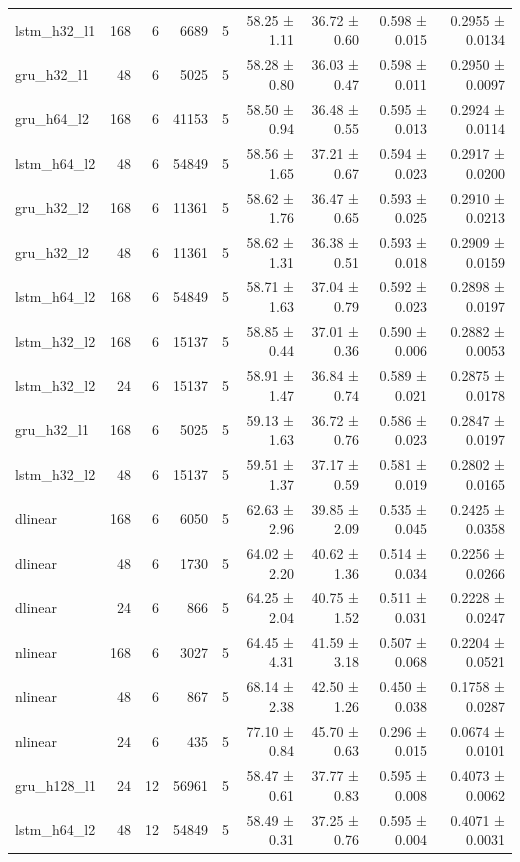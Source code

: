 \begin{table}[htbp]
\begin{tabular}{lrrrrrrrr}
lstm\_h32\_l1 & 168 & 6 & 6689 & 5 & 58.25 ± 1.11 & 36.72 ± 0.60 & 0.598 ± 0.015 & 0.2955 ± 0.0134 \\
gru\_h32\_l1 & 48 & 6 & 5025 & 5 & 58.28 ± 0.80 & 36.03 ± 0.47 & 0.598 ± 0.011 & 0.2950 ± 0.0097 \\
gru\_h64\_l2 & 168 & 6 & 41153 & 5 & 58.50 ± 0.94 & 36.48 ± 0.55 & 0.595 ± 0.013 & 0.2924 ± 0.0114 \\
lstm\_h64\_l2 & 48 & 6 & 54849 & 5 & 58.56 ± 1.65 & 37.21 ± 0.67 & 0.594 ± 0.023 & 0.2917 ± 0.0200 \\
gru\_h32\_l2 & 168 & 6 & 11361 & 5 & 58.62 ± 1.76 & 36.47 ± 0.65 & 0.593 ± 0.025 & 0.2910 ± 0.0213 \\
gru\_h32\_l2 & 48 & 6 & 11361 & 5 & 58.62 ± 1.31 & 36.38 ± 0.51 & 0.593 ± 0.018 & 0.2909 ± 0.0159 \\
lstm\_h64\_l2 & 168 & 6 & 54849 & 5 & 58.71 ± 1.63 & 37.04 ± 0.79 & 0.592 ± 0.023 & 0.2898 ± 0.0197 \\
lstm\_h32\_l2 & 168 & 6 & 15137 & 5 & 58.85 ± 0.44 & 37.01 ± 0.36 & 0.590 ± 0.006 & 0.2882 ± 0.0053 \\
lstm\_h32\_l2 & 24 & 6 & 15137 & 5 & 58.91 ± 1.47 & 36.84 ± 0.74 & 0.589 ± 0.021 & 0.2875 ± 0.0178 \\
gru\_h32\_l1 & 168 & 6 & 5025 & 5 & 59.13 ± 1.63 & 36.72 ± 0.76 & 0.586 ± 0.023 & 0.2847 ± 0.0197 \\
lstm\_h32\_l2 & 48 & 6 & 15137 & 5 & 59.51 ± 1.37 & 37.17 ± 0.59 & 0.581 ± 0.019 & 0.2802 ± 0.0165 \\
dlinear & 168 & 6 & 6050 & 5 & 62.63 ± 2.96 & 39.85 ± 2.09 & 0.535 ± 0.045 & 0.2425 ± 0.0358 \\
dlinear & 48 & 6 & 1730 & 5 & 64.02 ± 2.20 & 40.62 ± 1.36 & 0.514 ± 0.034 & 0.2256 ± 0.0266 \\
dlinear & 24 & 6 & 866 & 5 & 64.25 ± 2.04 & 40.75 ± 1.52 & 0.511 ± 0.031 & 0.2228 ± 0.0247 \\
nlinear & 168 & 6 & 3027 & 5 & 64.45 ± 4.31 & 41.59 ± 3.18 & 0.507 ± 0.068 & 0.2204 ± 0.0521 \\
nlinear & 48 & 6 & 867 & 5 & 68.14 ± 2.38 & 42.50 ± 1.26 & 0.450 ± 0.038 & 0.1758 ± 0.0287 \\
nlinear & 24 & 6 & 435 & 5 & 77.10 ± 0.84 & 45.70 ± 0.63 & 0.296 ± 0.015 & 0.0674 ± 0.0101 \\
gru\_h128\_l1 & 24 & 12 & 56961 & 5 & 58.47 ± 0.61 & 37.77 ± 0.83 & 0.595 ± 0.008 & 0.4073 ± 0.0062 \\
lstm\_h64\_l2 & 48 & 12 & 54849 & 5 & 58.49 ± 0.31 & 37.25 ± 0.76 & 0.595 ± 0.004 & 0.4071 ± 0.0031 \\

\end{tabular}
\end{table}
